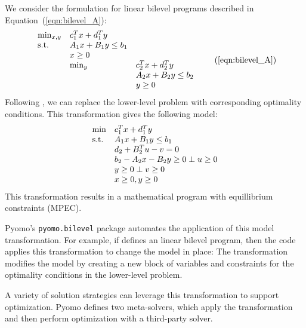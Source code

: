 We consider the formulation for linear bilevel programs described
in Equation~(\ref{eqn:bilevel_A}):
\begin{equation}
\begin{array}{lll}
\min_{x, y}         & c^T_1 x + d^T_1 y & \\
\st                 & A_1 x + B_1 y \leq b_1 & \\
                    & x \geq 0 & \\
                    & \min_{y}  & c^T_2 x + d^T_2 y\\
                    &           & A_2 x + B_2 y \leq b_2\\
                    &           & y \geq 0
\end{array}
\tag{\ref{eqn:bilevel_A}}
\end{equation}
Following \citet{Bard98}, we can
replace the lower-level problem with corresponding optimality
conditions.  This transformation gives the following model:
\begin{equation}
\label{eqn:bilevel_A_xfrm}
\begin{array}{ll}
\min & c^T_1 x + d^T_1 y\\
\textrm{s.t.}  & A_1 x + B_1 y \leq b_1\\
     & d_2 + B^T_2 u - v = 0\\
     & b_2 - A_2 x - B_2 y \geq 0 \perp u \geq 0\\
     & y \geq 0 \perp v \geq 0\\
     & x \geq 0, y \geq 0
\end{array}
\end{equation}
This transformation results in a mathematical program with equillibrium constraints (MPEC).

Pyomo's \texttt{pyomo.bilevel} package automates the application
of this model transformation.  For example, if  defines
an linear bilevel program,  then the code applies this transformation
to change the model in place:
The  transformation modifies the model
by creating a new block of variables and constraints for the
optimality conditions in the lower-level problem.

A variety of solution strategies can leverage this transformation
to support optimization.  Pyomo defines two meta-solvers, which
apply the  transformation and then perform
optimization with a third-party solver.

